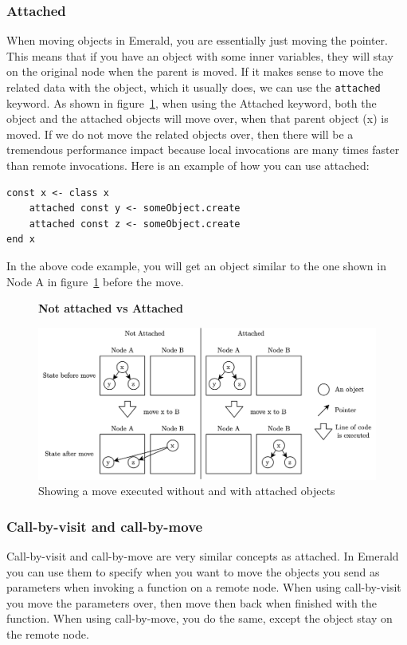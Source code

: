 \subsubsection{Attached}
When moving objects in Emerald, you are essentially just moving the pointer. This means that if you have an object with some inner variables, they will stay on the original node when the parent is moved. If it makes sense to move the related data with the object, which it usually does, we can use the \verb|attached| keyword.
As shown in figure~\ref{fig:emerald_attached_figure}, when using the Attached keyword, both the object and the attached objects will move over, when that parent object (x) is moved. If we do not move the related objects over, then there will be a tremendous performance impact because local invocations are many times faster than remote invocations. Here is an example of how you can use attached:
\begin{lstlisting}[language=emerald]
const x <- class x
    attached const y <- someObject.create
    attached const z <- someObject.create
end x
\end{lstlisting}
In the above code example, you will get an object similar to the one shown in Node A in figure~\ref{fig:emerald_attached_figure} before the move.

\begin{figure}[t]
    \centering
    \textbf{Not attached vs Attached}\par\medskip
    \includegraphics[scale=0.8]{chapters/background/figures/emerald_attached.png}
    \caption{Showing a move executed without and with attached objects}
    \label{fig:emerald_attached_figure}
\end{figure}

\subsubsection{Call-by-visit and call-by-move}
Call-by-visit and call-by-move are very similar concepts as attached. In Emerald you can use them to specify when you want to move the objects you send as parameters when invoking a function on a remote node. When using call-by-visit you move the parameters over, then move then back when finished with the function. When using call-by-move, you do the same, except the object stay on the remote node.

